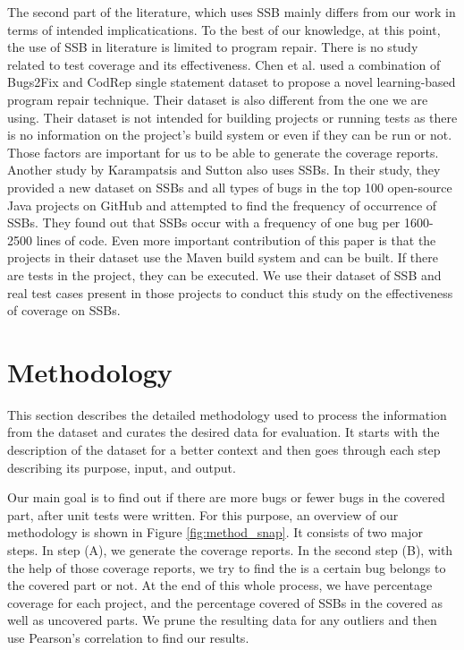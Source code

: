 \documentclass[sigconf,nonacm]{acmart}
\begin{document}
The second part of the literature, which uses SSB mainly differs from our work in terms of intended implicatications. To the best of our knowledge, at this point, the use of SSB in literature is limited to program repair. There is no study related to test coverage and its effectiveness. Chen et al. \cite{sequenceR} used a combination of Bugs2Fix \cite{bugs2fix} and CodRep \cite{coderep} single statement dataset to propose a novel learning-based program repair technique. Their dataset is also different from the one we are using. Their dataset is not intended for building projects or running tests as there is no information on the project's build system or even if they can be run or not. Those factors are important for us to be able to generate the coverage reports. Another study by Karampatsis and Sutton \cite{sstubs} also uses SSBs. In their study, they provided a new dataset on SSBs and all types of bugs in the top 100 open-source Java projects on GitHub and attempted to find the frequency of occurrence of SSBs. They found out that SSBs occur with a frequency of one bug per 1600-2500 lines of code. Even more important contribution of this paper is that the projects in their dataset use the Maven build system and can be built. If there are tests in the project, they can be executed. We use their dataset of SSB and real test cases present in those projects to conduct this study on the effectiveness of coverage on SSBs.


\section{Methodology}

This section describes the detailed methodology used to process the information from the dataset and curates the desired data for evaluation. It starts with the description of the dataset for a better context and then goes through each step describing its purpose, input, and output.

Our main goal is to find out if there are more bugs or fewer bugs in the covered part, after unit tests were written. For this purpose, an overview of our methodology is shown in Figure \ref{fig:method_snap}. It consists of two major steps. In step (A), we generate the coverage reports. In the second step (B), with the help of those coverage reports, we try to find the is a certain bug belongs to the covered part or not. At the end of this whole process, we have percentage coverage for each project, and the percentage covered of SSBs in the covered as well as uncovered parts. We prune the resulting data for any outliers and then use Pearson's correlation to find our results.
\end{document}
